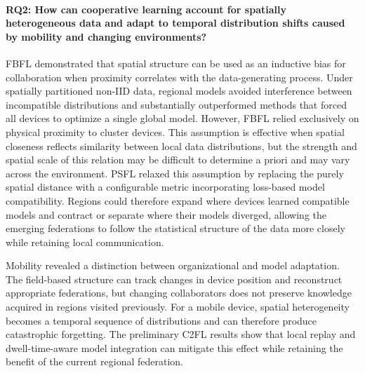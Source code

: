 \paragraph{RQ2: How can cooperative learning account for spatially heterogeneous
data and adapt to temporal distribution shifts caused by mobility and changing
environments?}
FBFL demonstrated that spatial structure can be used as an inductive bias for
collaboration when proximity correlates with the data-generating process. Under
spatially partitioned non-\gls{IID} data, regional models avoided interference
between incompatible distributions and substantially outperformed methods that
forced all devices to optimize a single global model.
%
However, 
 FBFL relied exclusively on physical proximity to cluster devices. 
% 
This assumption is effective when spatial closeness reflects similarity 
 between local data distributions, 
 but the strength and spatial scale of this relation may be difficult 
 to determine a priori and may vary across the environment. 
% 
PSFL relaxed this assumption by replacing the purely spatial distance 
 with a configurable metric incorporating loss-based model compatibility. 
% 
Regions could therefore expand where devices learned compatible models 
 and contract or separate where their models diverged, 
 allowing the emerging federations to follow the statistical structure of the data more closely 
 while retaining local communication.

Mobility revealed a distinction between organizational and model adaptation.
%
The field-based structure can track changes in device position 
 and reconstruct appropriate federations, 
 but changing collaborators does not preserve knowledge acquired in regions visited previously.
%
For a mobile device, 
 spatial heterogeneity becomes a temporal sequence of distributions 
 and can therefore produce catastrophic forgetting.
%
The preliminary C2FL results show that local replay and dwell-time-aware model integration 
 can mitigate this effect while retaining the benefit of the current regional federation.


